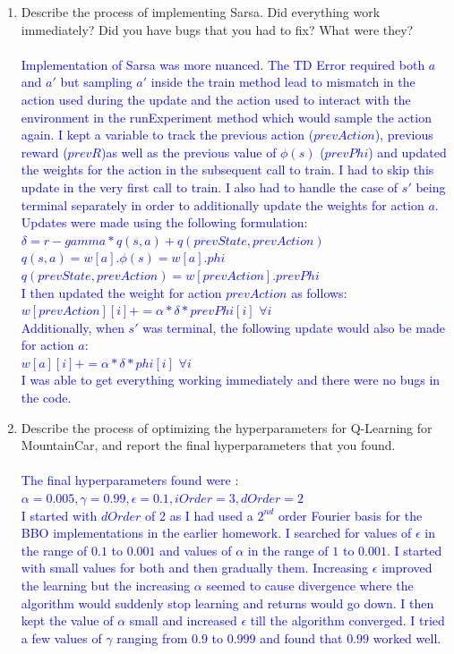 \documentclass[]{article}
\begin{document}
\begin{enumerate}
    \item Describe the process of implementing Sarsa. Did everything work immediately? Did you have bugs that you had to fix? What were they?
    \\\\
    \textcolor{blue}{
    	Implementation of Sarsa was more nuanced. The TD Error required both $a$ and $a'$ but sampling $a'$ inside the train method lead to mismatch in the action used during the update and the action used to interact with the environment in the runExperiment method which would sample the action again. I kept a variable to track the previous action ($prevAction$), previous reward ($prevR$)as well as the previous value of $\phi(s)$ ($prevPhi$) and updated the weights for the action in the subsequent call to train. I had to skip this update in the very first call to train. I also had to handle the case of $s'$ being terminal separately in order to additionally update the weights for action $a$. Updates were made using the following formulation:\\
    	$\delta = r - gamma*q(s,a) + q(prevState,prevAction)$\\
    	$q(s,a) = w[a].\phi(s) = w[a].phi $\\
    	$q(prevState,prevAction) = w[prevAction] . prevPhi$\\
    	I then updated the weight for action $prevAction$ as follows:\\
    	$w[prevAction][i] += \alpha*\delta*prevPhi[i]$ $\forall i $\\
    	Additionally, when $s'$ was terminal, the following update would also be made for action $a$:\\
    	$w[a][i] += \alpha*\delta*phi[i]$ $\forall i $\\
       	I was able to get everything working immediately and there were no bugs in the code.
    }

    \item Describe the process of optimizing the hyperparameters for Q-Learning for MountainCar, and report the final hyperparameters that you found.
    \\\\
    \textcolor{blue}{
    	The final hyperparameters found were :\\
    	$
    	\alpha  = 0.005,
    	\gamma = 0.99,
    	\epsilon = 0.1,
    	iOrder = 3,
    	dOrder = 2
    	$\\
    	I started with $dOrder$ of 2 as I had used a $2^{nd}$ order Fourier basis for the BBO implementations in the earlier homework. I searched for values of $\epsilon$ in the range of $0.1$ to $0.001$ and values of $\alpha$ in the range of $1$ to $0.001$.  I started with small values for both and then gradually them. Increasing $\epsilon$ improved the learning but the increasing $\alpha$ seemed to cause divergence where the algorithm would suddenly stop learning and returns would go down. I then kept the value of $\alpha$ small and increased $\epsilon$ till the algorithm converged. I tried a few values of $\gamma$ ranging from $0.9$ to $0.999$ and found that $0.99$ worked well.
    }


\end{enumerate}
\end{document}
